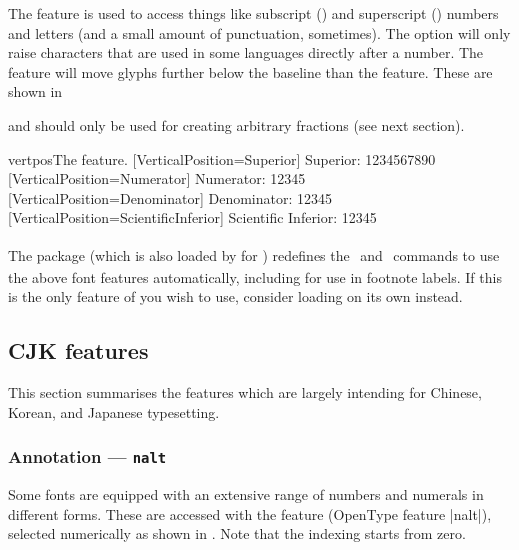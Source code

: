 \documentclass[a4paper]{l3doc}
\begin{document}
The  feature is used to access things like
subscript () and superscript () numbers and
letters (and a small amount of punctuation, sometimes).
The  option will only raise characters that are used
in some languages directly after a number.
The  feature will move glyphs
further below the baseline than the  feature.
These are shown in 

 and  should only be used for creating
arbitrary fractions (see next section).

\begin{Lexample}{vertpos}{The  feature.}
  [VerticalPosition=Superior]
   Superior: 1234567890                                   \\
  [VerticalPosition=Numerator]
   Numerator: 12345                                       \\
  [VerticalPosition=Denominator]
   Denominator: 12345                                     \\
  [VerticalPosition=ScientificInferior]
   Scientific Inferior: 12345
\end{Lexample}

The  package
(which is also loaded by  for \XeTeX)
redefines the \cmd\textsubscript\ and
\cmd\textsuperscript\ commands to use the above font features automatically,
including for use in footnote labels.
If this is the only feature of  you wish to use, consider
loading  on its own instead.



\subsection{CJK features}

This section summarises the features which are largely intending for Chinese, Korean,
and Japanese typesetting.


\subsubsection{Annotation --- \texttt{nalt} }

Some fonts are equipped with an extensive range of
numbers and numerals in different forms. These are accessed with the
 feature (OpenType feature |nalt|), selected numerically as shown in
. Note that the indexing starts from zero.
\end{document}
